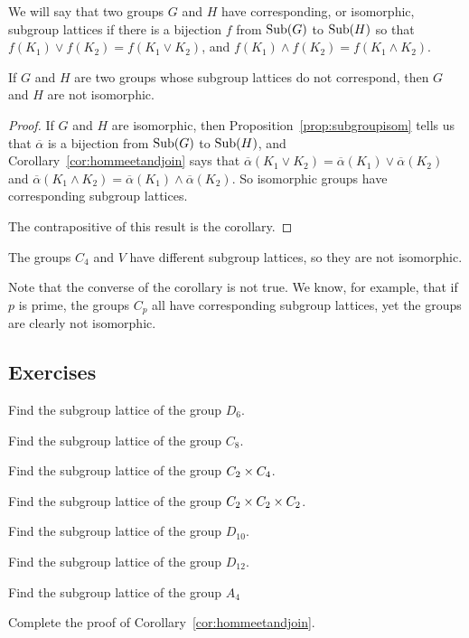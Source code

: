We will say that two groups $G$ and $H$ have corresponding, or
isomorphic, subgroup lattices if there is a bijection $f$ from
$\operatorname{Sub}(G)$ to $\operatorname{Sub}(H)$ so that $f(K_{1}) \vee f(K_{2}) = f(K_{1} \vee
K_{2})$, and $f(K_{1}) \wedge f(K_{2}) = f(K_{1} \wedge K_{2})$.

\begin{corollary}\label{cor:latticeisomtest}
  If $G$ and $H$ are two groups whose subgroup lattices do not
  correspond, then $G$ and $H$ are not isomorphic.
\end{corollary}
\begin{proof}
  If $G$ and $H$ are isomorphic, then
  Proposition~\ref{prop:subgroupisom} tells us that
  $\overline{\alpha}$ is a bijection from $\operatorname{Sub}(G)$ to $\operatorname{Sub}(H)$, and
  Corollary~\ref{cor:hommeetandjoin} says that
  $\overline{\alpha}(K_{1} \vee K_{2}) = \overline{\alpha}(K_{1}) \vee
  \overline{\alpha}(K_{2})$ and $\overline{\alpha}(K_{1} \wedge K_{2})
  = \overline{\alpha}(K_{1}) \wedge \overline{\alpha}(K_{2})$.  So 
  isomorphic groups have corresponding subgroup lattices.
  
  The contrapositive of this result is the corollary.
\end{proof}

\begin{example}
  The groups $C_{4}$ and $V$ have different subgroup lattices, so they 
  are not isomorphic.
\end{example}

Note that the converse of the corollary is not true.  We know, for example,
that if $p$ is prime, the groups $C_{p}$ all have corresponding subgroup
lattices, yet the groups are clearly not isomorphic.

\subsection*{Exercises}

\begin{exercises}
  \item Find the subgroup lattice of the group $D_{6}$.
  
  \item Find the subgroup lattice of the group $C_{8}$.
      
  \item Find the subgroup lattice of the group $C_{2} \times C_{4}$.
      
  \item Find the subgroup lattice of the group  $C_{2} \times C_{2} \times
    C_{2}$.
  
  \item Find the subgroup lattice of the group $D_{10}$.
    
  \item Find the subgroup lattice of the group $D_{12}$.
      
  \item Find the subgroup lattice of the group $A_{4}$
  
  \item Complete the proof of Corollary~\ref{cor:hommeetandjoin}.
\end{exercises}

